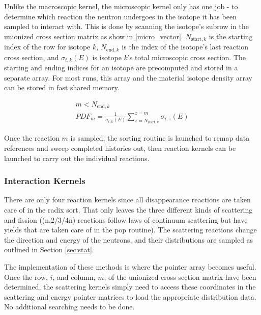Unlike the macroscopic kernel, the microscopic kernel only has one job - to determine which reaction the neutron undergoes in the isotope it has been sampled to interact with.  This is done by scanning the isotope's subrow in the unionized cross section matrix as show in \eqref{micro_vector}. 
 $N_{\mathrm{start},k}$ is the starting index of the row for isotope $k$, $N_{\mathrm{end},k}$ is the index of the isotope's last reaction cross section, and $\sigma_{t,k}(E)$ is isotope $k$'s total microscopic cross section.  The starting and ending indices for an isotope are precomputed and stored in a separate array.  For most runs, this array and the material isotope density array can be stored in fast shared memory.

\begin{equation}
\begin{gathered}
m <  N_{\mathrm{end},k}\\
 PDF_m = \frac{1}{\sigma_{t,k}(E)} \sum_{z=N_{\mathrm{start},k}}^{z=m}  \sigma_{i,z}(E)
 \end{gathered}
\label{micro_vector}
\end{equation}

Once the reaction $m$ is sampled, the sorting routine is launched to remap data references and sweep completed histories out, then reaction kernels can be launched to carry out the individual reactions.

\subsubsection{Interaction Kernels}

There are only four reaction kernels since all disappearance reactions are taken care of in the radix sort.  That only leaves the three different kinds of scattering and fission ((n,2/3/4n) reactions follow laws of continuum scattering but have yields that are taken care of in the pop routine).  The scattering reactions change the direction and energy of the neutrons, and their distributions are sampled as outlined in Section \ref{sec:stat}.  

The implementation of these methods is where the pointer array becomes useful.  Once the row, $i$, and column, $m$, of the unionized cross section matrix have been determined, the scattering kernels simply need to access these coordinates in the scattering and energy pointer matrices to load the appropriate distribution data.  No additional searching needs to be done.

